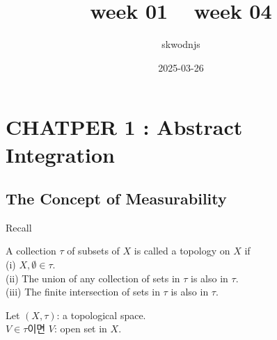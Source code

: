 \documentclass[11pt]{article}
\renewcommand{\(}{\left(}
\renewcommand{\)}{\right)}
\renewcommand{\[}{\left[}
\renewcommand{\]}{\right]}
\newcommand{\tags}[1]{#1}
\newenvironment{text-box}{}{}
\newcommand{\subheading}[1]{#1}
\begin{document}
\title{week 01 ~ week 04}
\date{2025-03-26}
\tags{}
\author{skwodnjs}

\maketitle

\section{CHATPER 1 : Abstract Integration}

\subsection{The Concept of Measurability}

\subheading{Recall}

\begin{text-box}
    A collection $\tau$ of subsets of $X$ is called a topology on $X$ if \\
    (i) $X, \emptyset \in \tau$. \\
    (ii) The union of any collection of sets in $\tau$ is also in $\tau$. \\
    (iii) The finite intersection of sets in $\tau$ is also in $\tau$.
\end{text-box}

\begin{text-box}
    Let $(X, \tau)$: a topological space. \\
    $V \in \tau$이면 $V$: open set in $X$.    
\end{text-box}
\end{document}

